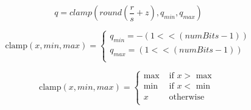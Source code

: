 \documentclass{article}
\begin{document}
\[ q = clamp(round(\frac{r}{s}+z), q_{min}, q_{max}) \]
\pagebreak

\[ \text{clamp}(x,min,max) = \begin{cases} q_{min} = -(1 << (numBits - 1)) \\ q_{max} = (1 << (numBits - 1)) \\ \end{cases} \]
\pagebreak

\[ \text{clamp}(x,min,max) = \begin{cases} \text{max} & \text{ if } x > \text{ max } \\ \text{min} & \text{ if } x < \text{ min } \\ x & \text{ otherwise } \\ \end{cases} \]
\pagebreak
\end{document}
